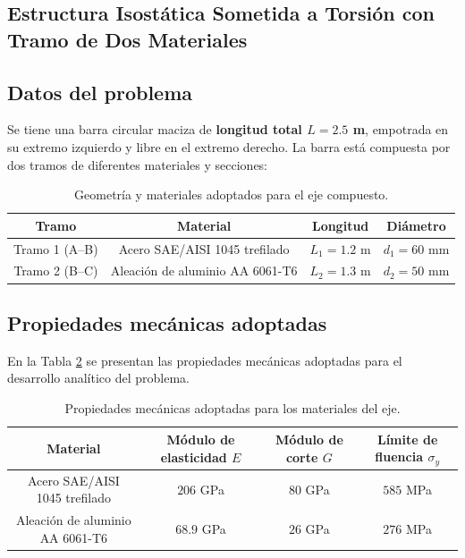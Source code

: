 \documentclass[12pt,a4paper]{article}
\begin{document}
\def\Eacero{206e9}
\def\Gacero{80e9}
\def\sigmayacero{585e6}
\def\rhoacero{7850}

\def\Ealuminio{68.9e9}
\def\Galuminio{26e9}
\def\sigmayaluminio{276e6}
\def\rhoaluminio{2700}

\subsection*{Estructura Isostática Sometida a Torsión con Tramo de Dos Materiales}

\subsection*{Datos del problema}

Se tiene una barra circular maciza de \textbf{longitud total $L = 2.5$ m}, empotrada en su extremo izquierdo y libre en el extremo derecho. La barra está compuesta por dos tramos de diferentes materiales y secciones:

\begin{table}[H]
\centering
\begin{tabular}{|c|c|c|c|}
\hline
\textbf{Tramo} & \textbf{Material} & \textbf{Longitud} & \textbf{Diámetro} \\
\hline
Tramo 1 (A--B) & Acero SAE/AISI 1045 trefilado & $L_1 = 1.2$ m & $d_1 = 60$ mm \\
\hline
Tramo 2 (B--C) & Aleación de aluminio AA 6061-T6 & $L_2 = 1.3$ m & $d_2 = 50$ mm \\
\hline
\end{tabular}
\caption{Geometría y materiales adoptados para el eje compuesto.}
\label{tab:datos_ej1}
\end{table}

\subsection*{Propiedades mecánicas adoptadas}

En la Tabla \ref{tab:propiedades_ej1} se presentan las propiedades mecánicas adoptadas para el desarrollo analítico del problema.

\begin{table}[H]
\centering
\begin{tabular}{|c|c|c|c|}
\hline
\textbf{Material} & \textbf{Módulo de elasticidad $E$} & \textbf{Módulo de corte $G$} & \textbf{Límite de fluencia $\sigma_y$} \\
\hline
Acero SAE/AISI 1045 trefilado & $206$ GPa & $80$ GPa & $585$ MPa \\
\hline
Aleación de aluminio AA 6061-T6 & $68.9$ GPa & $26$ GPa & $276$ MPa \\
\hline
\end{tabular}
\caption{Propiedades mecánicas adoptadas para los materiales del eje.}
\label{tab:propiedades_ej1}
\end{table}
\end{document}

